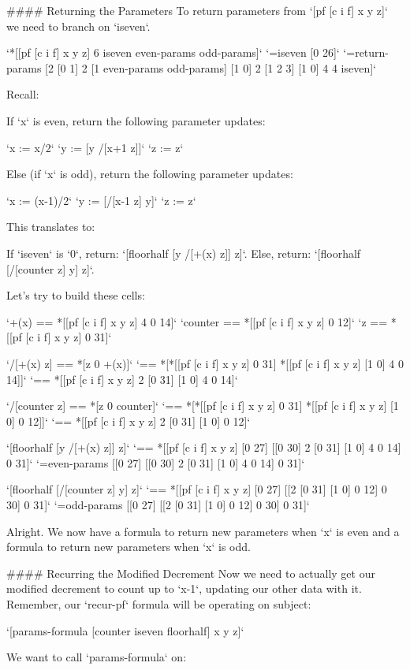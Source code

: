 \documentclass[twoside]{article}
\begin{document}
#### Returning the Parameters
To return parameters from `[pf [c i f] x y z]` we need to branch on `iseven`.

`*[[pf [c i f] x y z] 6 iseven even-params odd-params]`  
`=iseven [0 26]`  
`=return-params [2 [0 1] 2 [1 even-params odd-params] [1 0] 2 [1 2 3] [1 0] 4 4 iseven]`

Recall:

If `x` is even, return the following parameter updates:

`x := x/2`  
`y := [y /[x+1 z]]`  
`z := z`  

Else (if `x` is odd), return the following parameter updates:

`x := (x-1)/2`  
`y := [/[x-1 z] y]`  
`z := z`  

This translates to:

If `iseven` is `0`, return: `[floorhalf [y /[+(x) z]] z]`.  
Else, return: `[floorhalf [/[counter z] y] z]`.  

Let's try to build these cells:

`+(x) == *[[pf [c i f] x y z] 4 0 14]`  
`counter == *[[pf [c i f] x y z] 0 12]`  
`z == *[[pf [c i f] x y z] 0 31]`  

`/[+(x) z] == *[z 0 +(x)]`  
`== *[*[[pf [c i f] x y z] 0 31] *[[pf [c i f] x y z] [1 0] 4 0 14]]`  
`== *[[pf [c i f] x y z] 2 [0 31] [1 0] 4 0 14]`

`/[counter z] == *[z 0 counter]`  
`== *[*[[pf [c i f] x y z] 0 31] *[[pf [c i f] x y z] [1 0] 0 12]]`  
`== *[[pf [c i f] x y z] 2 [0 31] [1 0] 0 12]`  

`[floorhalf [y /[+(x) z]] z]`  
`== *[[pf [c i f] x y z] [0 27] [[0 30] 2 [0 31] [1 0] 4 0 14] 0 31]`  
`=even-params [[0 27] [[0 30] 2 [0 31] [1 0] 4 0 14] 0 31]`  

`[floorhalf [/[counter z] y] z]`  
`== *[[pf [c i f] x y z] [0 27] [[2 [0 31] [1 0] 0 12] 0 30] 0 31]`  
`=odd-params [[0 27] [[2 [0 31] [1 0] 0 12] 0 30] 0 31]`  

Alright. We now have a formula to return new parameters when `x` is even and a formula to return new parameters when `x` is odd.

#### Recurring the Modified Decrement
Now we need to actually get our modified decrement to count up to `x-1`, updating our other data with it. Remember, our `recur-pf` formula will be operating on subject:  

`[params-formula [counter iseven floorhalf] x y z]`  

We want to call `params-formula` on:
\end{document}
